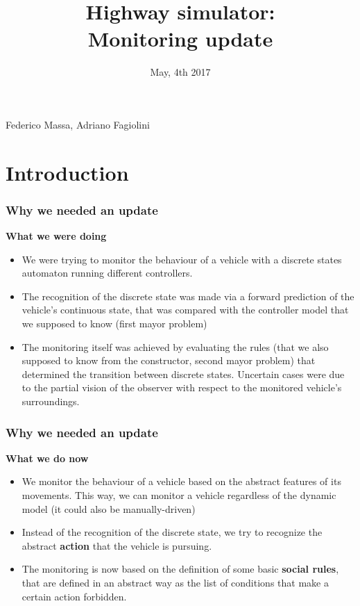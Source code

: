 \documentclass{beamer}
\title{Highway simulator: \\
Monitoring update}
\date{\small May, 4th 2017}
\begin{document}

{
\begin{frame}
\titlepage
\bigskip
\medskip
\centering\small Federico Massa, Adriano Fagiolini
\end{frame}}
\addtocounter{framenumber}{-1}

\section{Introduction}
\begin{frame}
\frametitle{Why we needed an update}
\textbf{What we were doing}
\begin{itemize}
	\item We were trying to monitor the behaviour of a vehicle
		  with a discrete states automaton running different
		  controllers.
 	\item The recognition of the discrete state was made via 
 		  a forward prediction of the vehicle's continuous state,
 		  that was compared with the controller model that we
 		  supposed to know (first mayor problem)
  	\item The monitoring itself was achieved by evaluating the
  		  rules (that we also supposed to know from the constructor, second 
  		  mayor problem) that determined the transition between
  		  discrete states. Uncertain cases were due to the 
  		  partial vision of the observer with respect to the 
  		  monitored vehicle's surroundings.
\end{itemize}
\end{frame}

\begin{frame}
\frametitle{Why we needed an update}
\textbf{What we do now}
\begin{itemize}
	\item We monitor the behaviour of a vehicle based on the
		  abstract features of its movements. This way, we can
		  monitor a vehicle regardless of the dynamic model 
		  (it could also be manually-driven)
 	\item Instead of the recognition of the discrete state,
 		  we try to recognize the abstract \textbf{action} 
 		  that the vehicle is pursuing. 
  	\item The monitoring is now based on the definition
  		  of some basic \textbf{social rules}, that 
  		  are defined in an abstract way as the list of
  		  conditions that make a certain action forbidden.
\end{itemize}
\end{frame}
\end{document}
